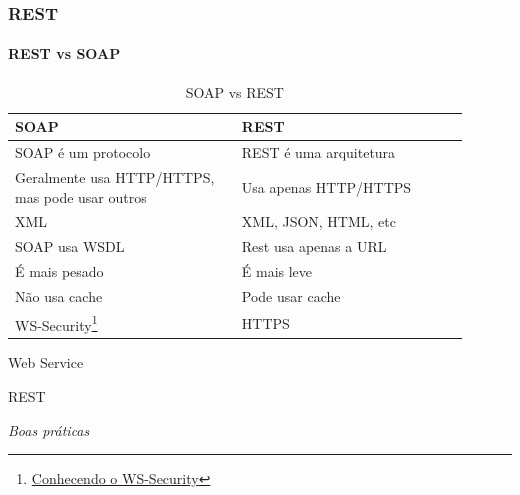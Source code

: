 \documentclass[
	9pt, %
	t, %
]{beamer}
\begin{document}
\begin{frame}
	\frametitle{REST}
	\framesubtitle{REST vs SOAP}
	
	\begin{table}
		\renewcommand{\arraystretch}{1.25} %
		\begin{tabular}{|p{0.45\linewidth}|p{0.45\linewidth}|}
			\hline
			\textbf{SOAP} & \textbf{REST} \\ \hline
			SOAP é um protocolo & REST é uma arquitetura \\ \hline
			Geralmente usa HTTP/HTTPS, mas pode usar outros & Usa apenas HTTP/HTTPS \\ \hline
			XML & XML, JSON, HTML, etc \\ \hline
			SOAP usa WSDL & Rest usa apenas a URL \\ \hline
			É mais pesado & É mais leve \\ \hline
			Não usa cache & Pode usar cache \\ \hline
			WS-Security\footnote{\href{https://xaropedecafe.medium.com/conhecendo-o-ws-security-c6c775b461fd}{Conhecendo o WS-Security}} & HTTPS \\ \hline
		\end{tabular}
		\caption{SOAP vs REST}
		\label{tab:soap_rest}

	\end{table}

\end{frame}

\begin{frame}
	\begin{center}
		
		\bigskip\bigskip\bigskip\bigskip %
		{\Large Web Service}
		
		\bigskip\bigskip %
		{\Huge REST}
		
		\smallskip
		{\small \textit{Boas práticas}}
	\end{center}

\end{frame}
\end{document}
